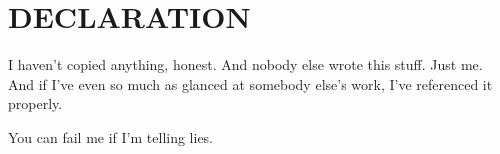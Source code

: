 \chapter*{DECLARATION}

I haven't copied anything, honest. And nobody else wrote this stuff.
Just me.  And if I've even so much as glanced at somebody else's work,
I've referenced it properly.

You can fail me if I'm telling lies.




